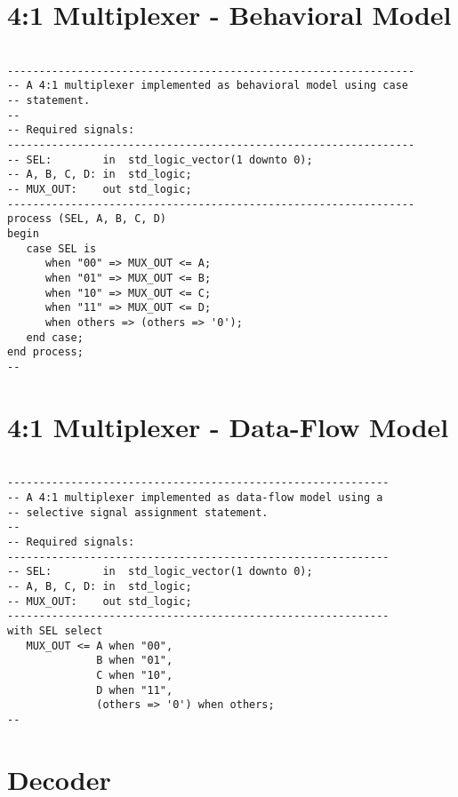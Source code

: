 \section{4:1 Multiplexer - Behavioral Model}

\noindent
\begin{minipage}{0.99\linewidth}
\begin{lstlisting}

----------------------------------------------------------------
-- A 4:1 multiplexer implemented as behavioral model using case
-- statement. 
--
-- Required signals: 
----------------------------------------------------------------
-- SEL:        in  std_logic_vector(1 downto 0);
-- A, B, C, D: in  std_logic;
-- MUX_OUT:    out std_logic;
----------------------------------------------------------------
process (SEL, A, B, C, D)
begin
   case SEL is
      when "00" => MUX_OUT <= A;
      when "01" => MUX_OUT <= B;
      when "10" => MUX_OUT <= C;
      when "11" => MUX_OUT <= D;
      when others => (others => '0');
   end case;
end process;
--
\end{lstlisting}
\end{minipage}

\section{4:1 Multiplexer - Data-Flow Model}

\noindent
\begin{minipage}{0.99\linewidth}
\begin{lstlisting}

------------------------------------------------------------
-- A 4:1 multiplexer implemented as data-flow model using a
-- selective signal assignment statement. 
--
-- Required signals: 
------------------------------------------------------------
-- SEL:        in  std_logic_vector(1 downto 0);
-- A, B, C, D: in  std_logic;
-- MUX_OUT:    out std_logic;
------------------------------------------------------------
with SEL select
   MUX_OUT <= A when "00", 
              B when "01", 
              C when "10", 
              D when "11", 
              (others => '0') when others;
--
\end{lstlisting}
\end{minipage}

\section{Decoder}

